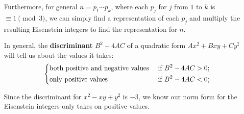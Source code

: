 \documentclass[11pt]{article}
\begin{document}
\begin{remark}
    Furthermore, for general $n = p_1 \cdots p_k$, where each $p_j$ for $j$ from $1$ to $k$ is $\equiv 1 \pmod{3}$,
    we can simply find a representation of each $p_j$ and multiply the resulting Eisenstein integers to find the representation for $n$.    
\end{remark}

\begin{remark}
In general, the \textbf{discriminant} $B^2 - 4AC$ of a quadratic form $Ax^2 + Bxy + Cy^2$ will tell us about the values it takes:
\[
    \begin{dcases}
        \text{both positive and negative values} & \text{ if } B^2 - 4AC > 0 ;\\
        \text{only positive values} & \text{ if } B^2 - 4AC < 0  ;\\
    \end{dcases}
\]

Since the discriminant for $x^2 - xy + y^2$ is $-3$, we know our norm form for the Eisenstein integers only takes on positive values.
\end{remark}
\end{document}

